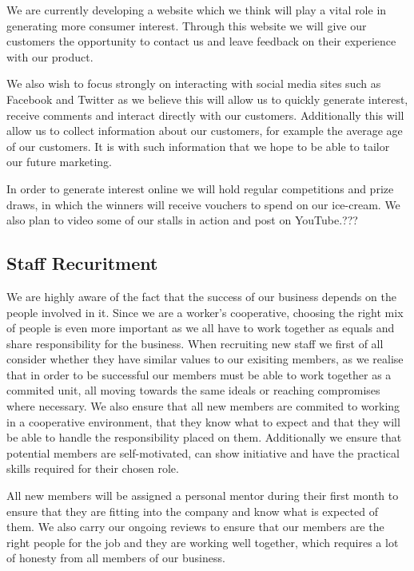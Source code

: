 \documentclass{article}
\begin{document}
  We are currently developing a website which we think will play a vital role in generating more consumer interest. Through this website we will give our customers the opportunity to contact us and leave feedback on their experience with our product.

  We also wish to focus strongly on interacting with social media sites such as Facebook and Twitter as we believe this will allow us to quickly generate interest, receive comments and interact directly with our customers. Additionally this will allow us to collect information about our customers, for example the average age of our customers. It is with such information that we hope to be able to tailor our future marketing.

  In order to generate interest online we will hold regular competitions and prize draws, in which the winners will receive vouchers to spend on our ice-cream. We also plan to video some of our stalls in action and post on YouTube.???

  \subsection{Staff Recuritment}

  We are highly aware of the fact that the success of our business depends on the people involved in it. Since we are a worker's cooperative, choosing the right mix of people is even more important as we all have to work together as equals and share responsibility for the business. When recruiting new staff we first of all consider whether they have similar values to our exisiting members, as we realise that in order to be successful our members must be able to work together as a commited unit, all moving towards the same ideals or reaching compromises where necessary. We also ensure that all new members are commited to working in a cooperative environment, that they know what to expect and that they will be able to handle the responsibility placed on them. Additionally we ensure that potential members are self-motivated, can show initiative and have the practical skills required for their chosen role.

  All new members will be assigned a personal mentor during their first month to ensure that they are fitting into the company and know what is expected of them. We also carry our ongoing reviews to ensure that our members are the right people for the job and they are working well together, which requires a lot of honesty from all members of our business.
\end{document}
